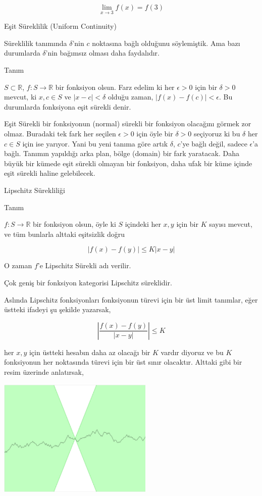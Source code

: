 \documentclass[12pt,fleqn]{article}\usepackage{../../common}
\begin{document}
$$ \lim_{x \to 3} f(x) = f(3) $$

Eşit Süreklilik (Uniform Continuity) 

Süreklilik tanımında $\delta$'nin $c$ noktasına bağlı olduğunu söylemiştik. Ama
bazı durumlarda $\delta$'nin bağımsız olması daha faydalıdır.

Tanım

$S \subset \mathbb{R}$, $f:S \to \mathbb{R}$ bir fonksiyon olsun. Farz edelim ki
her $\epsilon > 0$ için bir $\delta > 0$ mevcut, ki $x,c \in S$ ve $|x-c| <
\delta$ olduğu zaman, $|f(x) - f(c)| < \epsilon$.  Bu durumlarda fonksiyona eşit
sürekli denir.

Eşit Sürekli bir fonksiyonun (normal) sürekli bir fonksiyon olacağını görmek zor
olmaz. Buradaki tek fark her seçilen $\epsilon > 0$ için öyle bir $\delta > 0$
seçiyoruz ki bu $\delta$ her $c \in S$ için ise yarıyor. Yani bu yeni tanıma
göre artık $\delta$, $c$'ye bağlı değil, sadece $\epsilon$'a bağlı. Tanımın
yapıldığı arka plan, bölge (domain) bir fark yaratacak. Daha büyük bir kümede
eşit sürekli olmayan bir fonksiyon, daha ufak bir küme içinde eşit sürekli
haline gelebilecek.

Lipschitz Sürekliliği 

Tanım 

$f:S \to \mathbb{R}$ bir fonksiyon olsun, öyle ki $S$ içindeki her $x,y$ için
bir $K$ sayısı mevcut, ve tüm bunlarla alttaki eşitsizlik doğru

$$ |f(x) - f(y)| \le K|x-y| $$

O zaman $f$'e Lipschitz Sürekli adı verilir. 

Çok geniş bir fonksiyon kategorisi Lipschitz süreklidir. 

Aslında Lipschitz fonksiyonları fonksiyonun türevi için bir üst limit
tanımlar, eğer üstteki ifadeyi şu şekilde yazarsak,

$$ \left|\frac{f(x) - f(y)}{|x-y|} \right| \le K $$

her $x,y$ için üstteki hesabın daha az olacağı bir $K$ vardır diyoruz ve bu
$K$ fonksiyonun her noktasında türevi için bir üst sınır olacaktır. Alttaki
gibi bir resim üzerinde anlatırsak,

\includegraphics[width=20em]{2_7.png}
\end{document}
